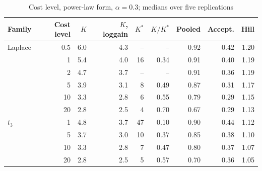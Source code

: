 \begin{table}[htbp]
\centering
\caption{Cost level, power-law form, $\alpha = 0.3$; medians over five replications}
\label{tab:costlevel}
\small
\begin{tabular}{lrrrrrrrr}
\toprule
Family & Cost level & $K$ & $K$, loggain & $K^*$ & $K/K^*$ & Pooled & Accept. & Hill \\
\midrule
Laplace & 0.5 & 6.0 & 4.3 & -- & -- & 0.92 & 0.42 & 1.20 \\
 & 1 & 5.4 & 4.0 & 16 & 0.34 & 0.91 & 0.40 & 1.19 \\
 & 2 & 4.7 & 3.7 & -- & -- & 0.91 & 0.36 & 1.19 \\
 & 5 & 3.9 & 3.1 & 8 & 0.49 & 0.87 & 0.31 & 1.17 \\
 & 10 & 3.3 & 2.8 & 6 & 0.55 & 0.79 & 0.29 & 1.15 \\
 & 20 & 2.8 & 2.5 & 4 & 0.70 & 0.67 & 0.29 & 1.13 \\
\midrule
$t_3$ & 1 & 4.8 & 3.7 & 47 & 0.10 & 0.90 & 0.44 & 1.12 \\
 & 5 & 3.7 & 3.0 & 10 & 0.37 & 0.85 & 0.38 & 1.10 \\
 & 10 & 3.3 & 2.8 & 7 & 0.47 & 0.80 & 0.37 & 1.07 \\
 & 20 & 2.8 & 2.5 & 5 & 0.57 & 0.70 & 0.36 & 1.05 \\
\bottomrule
\end{tabular}
\end{table}
